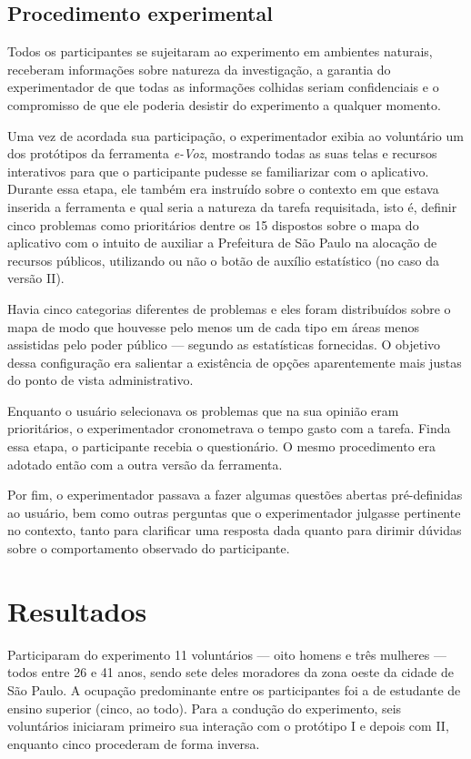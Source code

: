 \documentclass{sigchi}
\begin{document}
\subsection{Procedimento experimental}
Todos os participantes se sujeitaram ao experimento em ambientes naturais, receberam informações sobre natureza da investigação, a garantia do experimentador de que todas as informações colhidas seriam confidenciais e o compromisso de que ele poderia desistir do experimento a qualquer momento.

Uma vez de acordada sua participação, o experimentador exibia ao voluntário um dos protótipos da ferramenta \textit{e-Voz}, mostrando todas as suas telas e recursos interativos para que o participante pudesse se familiarizar com o aplicativo. Durante essa etapa, ele também era instruído sobre o contexto em que estava inserida a ferramenta e qual seria a natureza da tarefa requisitada, isto é, definir cinco problemas como prioritários dentre os 15 dispostos sobre o mapa do aplicativo com o intuito de auxiliar a Prefeitura de São Paulo na alocação de recursos públicos, utilizando ou não o botão de auxílio estatístico (no caso da versão II).

Havia cinco categorias diferentes de problemas e eles foram distribuídos sobre o mapa de modo que houvesse pelo menos um de cada tipo em áreas menos assistidas pelo poder público --- segundo as estatísticas fornecidas. O objetivo dessa configuração era salientar a existência de opções aparentemente mais justas do ponto de vista administrativo.

Enquanto o usuário selecionava os problemas que na sua opinião eram prioritários, o experimentador cronometrava o tempo gasto com a tarefa. Finda essa etapa, o participante recebia o questionário. O mesmo procedimento era adotado então com a outra versão da ferramenta.

Por fim, o experimentador passava a fazer algumas questões abertas pré-definidas ao usuário, bem como outras perguntas que o experimentador julgasse pertinente no contexto, tanto para clarificar uma resposta dada quanto para dirimir dúvidas sobre o comportamento observado do participante.


\section{Resultados}
Participaram do experimento 11 voluntários --- oito homens e três mulheres --- todos entre 26 e 41 anos, sendo sete deles moradores da zona oeste da cidade de São Paulo. A ocupação predominante entre os participantes foi a de estudante de ensino superior (cinco, ao todo). Para a condução do experimento, seis voluntários iniciaram primeiro sua interação com o protótipo I e depois com II, enquanto cinco procederam de forma inversa.
\end{document}
